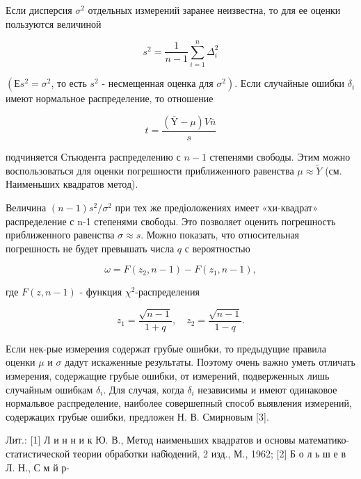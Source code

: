 \documentclass[10pt]{article}
\begin{document}
Если дисперсия $\sigma^{2}$ отдельных измерений заранее неизвестна, то для ее оценки пользуются величиной

\[
s^{2}=\frac{1}{n-1} \sum_{i=1}^{n} \Delta_{i}^{2}
\]

$\left(Е s^{2}=\sigma^{2}\right.$, то есть $s^{2}$ - несмещенная оценка для $\left.\sigma^{2}\right)$. Если случайные ошибки $\delta_{i}$ имеют нормальное распределение, то отношение

\[
t=\frac{(\overline{\mathrm{Y}}-\mu) V \bar{n}}{s}
\]

подчиняется Стьюдента распределению с $n-1$ степенями свободы. Этим можно воспользоваться для оценки погрешности приближенного равенства $\mu \approx \tilde{Y}$ (см. Наименьших квадратов метод).

Величина $(n-1) s^{2} / \sigma^{2}$ при тех же предіоложениях имеет «хи-квадрат» распределение с n-1 степенями свободы. Это позволяет оценить погрешность приближенного равенства $\sigma \approx s$. Можно показать, что относительная погрешность не будет превышать числа $q$ с вероятностью

\[
\omega=F\left(z_{2}, n-1\right)-F\left(z_{1}, n-1\right),
\]

где $F(z, n-1)$ - функция $\chi^{2}$-распределения

\[
z_{1}=\frac{\sqrt{n-1}}{1+q}, \quad z_{2}=\frac{\sqrt{n-1}}{1-q} .
\]

Если нек-рые измерения содержат грубые ошибки, то предыдущие правила оценки $\mu$ и $\sigma$ дадут искаженные результаты. Поэтому очень важно уметь отличать измерения, содержащие грубые ошибки, от измерений, подверженных лишь случайным ошибкам $\delta_{i}$. Для случая, когда $\delta_{i}$ независимы и имеют одинаковое нормальвое распределение, наиболее совершепный способ выявления измерений, содержацих грубые ошибки, предложен Н. В. Смирновым [3].

Лит.: [1] Л и н н и к Ю. В., Метод наименьших квадратов и основы математико-статистической теории обработки наб̆юдений, 2 изд., М., 1962; [2] Б о л ь ш е в Л. Н., С м й р-
\end{document}
